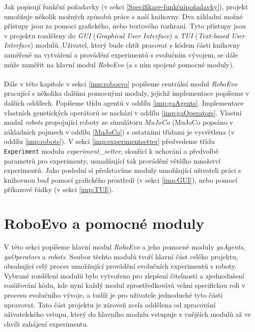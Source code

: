 Jak popisují funkční požadavky (v sekci \ref{Specifikace-funkčnípožadavky}),
projekt umožňuje několik možných způsobů práce s naší knihovny. Dva základní
možné přístupy jsou za pomoci grafického, nebo textového rozhraní. Tyto
přístupy jsou v projektu rozděleny do \emph{GUI} (\emph{Graphical User
Interface}) a \emph{TUI} (\emph{Text-based User Interface}) modulů. Uživatel,
který bude chtít pracovat s kódem části knihovny zaměřené na vytváření a
provádění experimentů s evolučním vývojem, se dále může zaměřit na hlavní modul
\emph{RoboEvo} (a s ním spojené pomocné moduly).

\paragraph{} 
Dále v této kapitole v sekci \ref{imp:roboevo} popíšeme centrální modul
\emph{RoboEvo} pracující s několika dalšími pomocnými moduly, jejichž
implementace popíšeme v dalších oddílech. Popíšeme třídu agentů v oddílu
\ref{imp:gaAgents}. Implementace vlastních genetických operátorů se nachází v
oddílu \ref{imp:gaOperators}. Vlastní modul \emph{robots} propojující roboty ze
simulátoru \emph{MuJoCo} (MuJoCo popsáno v základních pojmech v oddílu
\ref{MuJoCo}) s ostatními třídami je vysvětlena (v oddílu \ref{imp:robots}). V
sekci \ref{imp:experimentsetter} předvedeme třídu \texttt{Experiment} modulu
\emph{experiment\_setter}, sloužící k uchování a předvolbě parametrů pro
experimenty, usnadňující tak provádění většího množství experimentů. Jako
poslední si představíme moduly umožňující uživateli práci s knihovnou buď
pomocí grafického prostředí (v sekci \ref{imp:GUI}), nebo pomocí příkazové
řádky (v sekci \ref{imp:TUI}). 

\section{RoboEvo a pomocné moduly}
V této sekci popíšeme hlavní modul \emph{RoboEvo} a jeho pomocné moduly
\linebreak \emph{gaAgents}, \emph{gaOperators} a \emph{robots}. Soubor těchto
modulů tvoří hlavní část celého projektu, obsahující celý proces umožňující
provádění evolučních experimentů s roboty. Vybrané rozdělení modulů bylo
vytvořeno pro zlepšení čitelnosti a zjednodušení rozšiřování kódu, kde nyní
každý modul zprostředkovává velmi specifickou roli v procesu evolučního vývoje,
a tudíž je pro uživatele jednoduché tyto části upravovat. Tato část projektu je
zároveň zcela oddělena od zpracování uživatelského vstupu, který do hlavního
modulu vstupuje z vnějších modulů až ve chvíli zahájení experimentu. 

